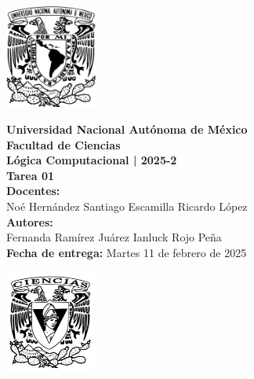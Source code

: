 \documentclass[11pt,letterpaper]{article}
\begin{document}
\begin{center}
  \begin{minipage}{3cm}
    \begin{center}
      \includegraphics[height=3.4cm]{unam_logo.png}
    \end{center}
  \end{minipage}\hfill
  \begin{minipage}{10cm}
    \begin{center}
      \textbf{\Large Universidad Nacional Autónoma de México}\\[0.2cm]
      \textbf{\large Facultad de Ciencias}\\[0.2cm]
      \textbf{Lógica Computacional | 2025-2}\\[0.4cm]
      \textbf{\Large Tarea 01}\\[0.1cm]
      \textbf{Docentes:}\\
      Noé Hernández \hspace{1em} Santiago Escamilla \hspace{1em} Ricardo López\\[0.3cm]
      \textbf{Autores:}\\
      Fernanda Ramírez Juárez \quad Ianluck Rojo Peña\\[0.3cm]
      \textbf{Fecha de entrega:} Martes 11 de febrero de 2025
    \end{center}
  \end{minipage}\hfill
  \begin{minipage}{3cm}
    \begin{center}
      \includegraphics[height=3.4cm]{fc_logo.png}
    \end{center}
  \end{minipage}
\end{center}
\end{document}
